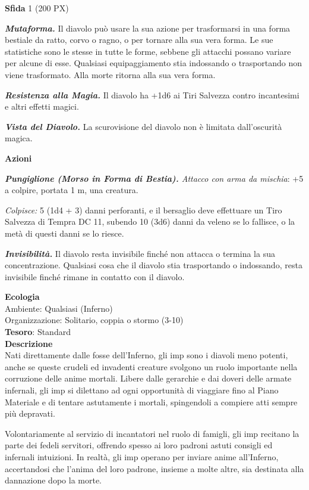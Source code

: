 \begin{multicols}{2}
\textbf{Sfida} 1 (200 PX)

\textit{\textbf{Mutaforma.}} Il diavolo può usare la sua azione per trasformarsi in una forma bestiale da ratto, corvo o ragno, o per tornare alla sua vera forma. Le sue statistiche sono le stesse in tutte le forme, sebbene gli attacchi possano variare per alcune di esse. Qualsiasi equipaggiamento stia indossando o trasportando non viene trasformato. Alla morte ritorna alla sua vera forma.

\textit{\textbf{Resistenza alla Magia.}} Il diavolo ha +1d6 ai Tiri Salvezza contro incantesimi e altri effetti magici.

\textit{\textbf{Vista del Diavolo.}} La scurovisione del diavolo non è limitata dall'oscurità magica.

\textbf{Azioni}

\textit{\textbf{Pungiglione (Morso in Forma di Bestia).} Attacco con arma da mischia}: +5 a colpire, portata 1 m, una creatura.

\textit{Colpisce:} 5 (1d4 + 3) danni perforanti, e il bersaglio deve effettuare un Tiro Salvezza di Tempra DC 11, subendo 10 (3d6) danni da veleno se lo fallisce, o la metà di questi danni se lo riesce.

\textit{\textbf{Invisibilità.}} Il diavolo resta invisibile finché non attacca o termina la sua concentrazione. Qualsiasi cosa che il diavolo stia trasportando o indossando, resta invisibile finché rimane in contatto con il diavolo.

\textbf{Ecologia}\\
Ambiente: Qualsiasi (Inferno)\\
Organizzazione: Solitario, coppia o stormo (3-10)\\
\textbf{Tesoro}: Standard\\
\textbf{Descrizione}\\
Nati direttamente dalle fosse dell'Inferno, gli imp sono i diavoli meno potenti, anche se queste crudeli ed invadenti creature svolgono un ruolo importante nella corruzione delle anime mortali. Libere dalle gerarchie e dai doveri delle armate infernali, gli imp si dilettano ad ogni opportunità di viaggiare fino al Piano Materiale e di tentare astutamente i mortali, spingendoli a compiere atti sempre più depravati.

Volontariamente al servizio di incantatori nel ruolo di famigli, gli imp recitano la parte dei fedeli servitori, offrendo spesso ai loro padroni astuti consigli ed infernali intuizioni. In realtà, gli imp operano per inviare anime all'Inferno, accertandosi che l'anima del loro padrone, insieme a molte altre, sia destinata alla dannazione dopo la morte.


\end{multicols}
